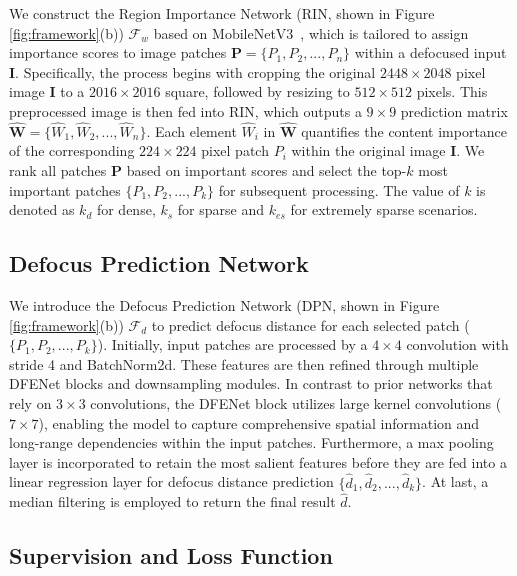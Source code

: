 We construct the Region Importance Network (RIN, shown in Figure \ref{fig:framework}(b)) $\mathcal{F}_w$ based on MobileNetV3~\cite{howard2019searching}, which is tailored to assign importance scores to image patches $\mathbf{P} = \{ P_1, P_2, ..., P_n \}$ within a defocused input $\mathbf{I}$.
Specifically, the process begins with cropping the original $2448 \times 2048$ pixel image $\mathbf{I}$ to a $2016 \times 2016$ square, followed by resizing to $512 \times 512$ pixels. This preprocessed image is then fed into RIN, which outputs a $9 \times 9$ prediction matrix $\widehat{\mathbf{W}} = \{ \widehat{W}_1, \widehat{W}_2, ..., \widehat{W}_n \}$. Each element $\widehat{W}_i$ in $\widehat{\mathbf{W}}$ quantifies the content importance of the corresponding $224 \times 224$ pixel patch $P_i$ within the original image $\mathbf{I}$.
We rank all patches $\mathbf{P}$ based on important scores and select the top-$k$ most important patches $\{P_1, P_2,..., P_k\}$ for subsequent processing. The value of $k$ is denoted as $k_d$ for dense, $k_s$ for sparse and $k_{es}$ for extremely sparse scenarios.

\subsection{Defocus Prediction Network}\label{subsec:network-defocus}

We introduce the Defocus Prediction Network (DPN, shown in Figure \ref{fig:framework}(b)) $\mathcal{F}_d$ to predict defocus distance for each selected patch ($\{ P_1, P_2, ..., P_k \}$). Initially, input patches are processed by a $4 \times 4$ convolution with stride 4 and BatchNorm2d.
These features are then refined through multiple DFENet blocks and downsampling modules. In contrast to prior networks that rely on $3 \times 3$ convolutions, the DFENet block utilizes large kernel convolutions ($7 \times 7$), enabling the model to capture comprehensive spatial information and long-range dependencies within the input patches.
Furthermore, a max pooling layer is incorporated to retain the most salient features before they are fed into a linear regression layer for defocus distance prediction $\{\widehat{d}_1, \widehat{d}_2,..., \widehat{d}_k\}$.
At last, a median filtering is employed to return the final result $\widehat{d}$.


\subsection{Supervision and Loss Function}\label{subsec:supervison}

